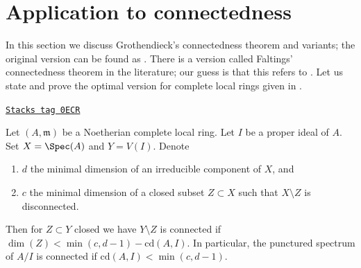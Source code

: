 \section{Application to connectedness}
\label{algebraization-section-connected}
In this section we discuss Grothendieck's connectedness theorem
and variants; the original version can be found as
\cite[Exposee XIII, Theorem 2.1]{SGA2}. There is a version
called Faltings' connectedness theorem in the literature;
our guess is that this refers to \cite[Theorem 6]{Faltings-some}.
Let us state and prove the optimal version for complete
local rings given in \cite[Theorem 1.6]{Varbaro}.

\begin{lemma}
\label{algebraization-lemma-punctured-still-connected}
\href{https://stacks.math.columbia.edu/tag/0ECR}{\texttt{Stacks tag 0ECR}}

\begin{reference}
\cite[Theorem 1.6]{Varbaro}
\end{reference}
Let $(A, \mathfrak m)$ be a Noetherian complete local ring.
Let $I$ be a proper ideal of $A$.
Set $X = \Spec(A)$ and $Y = V(I)$.
Denote
\begin{enumerate}
\item $d$ the minimal dimension of an irreducible component of $X$, and
\item $c$ the minimal dimension of a closed subset $Z \subset X$
such that $X \setminus Z$ is disconnected.
\end{enumerate}
Then for $Z \subset Y$ closed we have $Y \setminus Z$ is connected if
$\dim(Z) < \min(c, d - 1) - \text{cd}(A, I)$. In particular, the punctured
spectrum of $A/I$ is connected if $\text{cd}(A, I) < \min(c, d - 1)$.
\end{lemma}

